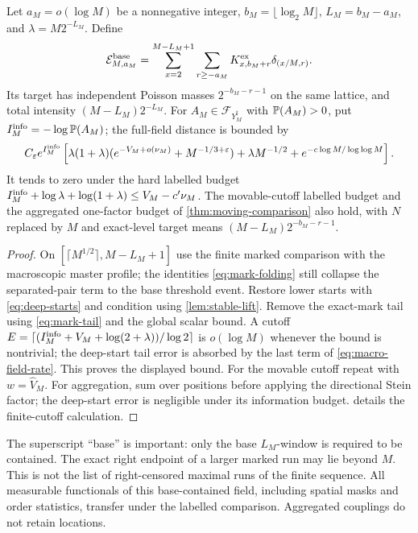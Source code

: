 \begin{theorem}\label{thm:macro-field}
Let $a_M=o(\log M)$ be a nonnegative integer, $b_M=\lfloor\log_2M\rfloor$,
$L_M=b_M-a_M$, and $\lambda=M2^{-L_M}$. Define
\[
 \mathcal E^{\rm base}_{M,a_M}
 =\sum_{x=2}^{M-L_M+1}\sum_{r\ge-a_M}
             K^{\rm ex}_{x,b_M+r}\delta_{(x/M,r)}.
\]
Its target has independent Poisson masses $2^{-b_M-r-1}$ on the same
lattice, and total intensity $(M-L_M)2^{-L_M}$.
For $A_M\in\mathcal F_{Y_M^\sharp}$ with $\mathbb P(A_M)>0$, put
$I_M^{\rm info}=-\log\mathbb P(A_M)$;
the full-field distance is bounded by
\begin{equation}\label{eq:macro-field-rate}
 C_\varepsilon e^{I_M^{\rm info}}
 \left[\lambda(1+\lambda)(e^{-V_M+o(\nu_M)}+M^{-1/3+\varepsilon})
            +\lambda M^{-1/2}+e^{-c\log M/\log\log M}\right].
\end{equation}
It tends to zero under the hard labelled budget
$I_M^{\rm info}+\log\lambda+\log(1+\lambda)\le V_M-c'\nu_M$.
The movable-cutoff labelled budget and the aggregated one-factor budget
of \cref{thm:moving-comparison} also hold, with $N$ replaced by $M$ and
exact-level target means $(M-L_M)2^{-b_M-r-1}$.
\end{theorem}
\begin{proof}
On $[\lceil M^{1/2}\rceil,M-L_M+1]$ use the finite marked comparison
with the macroscopic master profile; the identities
\eqref{eq:mark-folding} still collapse the separated-pair term to the
base threshold event. Restore lower starts with \eqref{eq:deep-starts}
and condition using \cref{lem:stable-lift}. Remove the exact-mark tail
using \eqref{eq:mark-tail} and the global scalar bound. A cutoff
$E=\lceil(I_M^{\rm info}+V_M+\log(2+\lambda))/\log2\rceil$ is
$o(\log M)$ whenever the bound is nontrivial; the deep-start tail error
is absorbed by the last term of \eqref{eq:macro-field-rate}.
This proves the displayed bound.
For the movable cutoff repeat with $w=\widehat V_M$.
For aggregation, sum over positions before applying the directional Stein
factor; the deep-start error is negligible under its information
budget.  details the finite-cutoff calculation.
\end{proof}
The superscript ``base'' is important: only the base $L_M$-window is
required to be contained. The exact right endpoint of a larger marked run
may lie beyond $M$. This is not the list of right-censored maximal runs of
the finite sequence. All measurable functionals of this base-contained
field, including spatial masks and order statistics, transfer under the
labelled comparison. Aggregated couplings do not retain locations.

